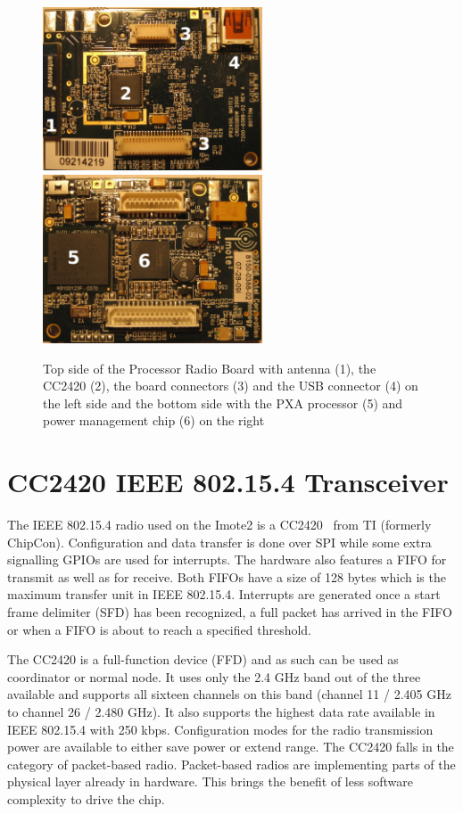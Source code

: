 \begin{figure}
  \begin{center}
    \includegraphics[width=6.5cm]{images/imote_top_cutted2}
    \includegraphics[width=6.5cm]{images/imote_bottom_cutted2}
    \caption{Top side of the Processor Radio Board with antenna (1), the CC2420 (2),
	     the board connectors (3) and the USB connector (4) on the left side
	     and the bottom side with the PXA processor (5) and power management
	     chip (6) on the right}
        \label{fig:imote2top}
  \end{center}
\end{figure}

\section{CC2420 IEEE 802.15.4 Transceiver}
\label{cc2420}
The IEEE 802.15.4 radio used on the Imote2 is a CC2420~\cite{cc2420} from TI (formerly ChipCon).
Configuration and data transfer is done over SPI while some extra signalling
GPIOs are used for interrupts. The hardware also features a FIFO for transmit as
well as for receive. Both FIFOs have a size of 128 bytes which is the maximum
transfer unit in IEEE 802.15.4. Interrupts are generated once a start frame delimiter
(SFD) has been recognized, a full packet has arrived in the FIFO or when a FIFO is
about to reach a specified threshold.

The CC2420 is a full-function device (FFD) and as such can be used as
coordinator or normal node. It uses only the 2.4 GHz band out of the three
available and supports all sixteen channels on this band (channel 11 / 2.405 GHz
to channel 26 / 2.480 GHz). It also supports the highest data rate available
in IEEE 802.15.4 with 250 kbps. Configuration modes for the radio transmission power
are available to either save power or extend range. The CC2420 falls in the
category of packet-based radio. Packet-based radios are implementing parts of
the physical layer already in hardware. This brings the benefit of less software
complexity to drive the chip.

